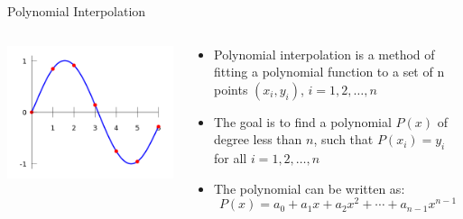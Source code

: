 \documentclass[fullscreen=true, bookmarks=true, hyperref={pdfencoding=unicode}]{beamer}
\begin{document}
\begin{frame}{Polynomial Interpolation}
  \begin{columns}
      \begin{column}{.3\paperwidth}
        \includegraphics[keepaspectratio, width=.3\paperwidth]{440px-Interpolation_example_polynomial.png}
      \end{column}
      \begin{column}{.7\paperwidth}
        \begin{itemize}
        \item Polynomial interpolation is a method of fitting 
        a polynomial function to a set of n points $(x_i, y_i)$, $i = 1, 2, \dots, n$
        \item The goal is to find a polynomial $P(x)$ of degree less than $n$, 
        such that $P(x_i) = y_i$ for all $i = 1, 2, \dots, n$
        \item The polynomial can be written as:
          \[
          P(x) = a_0 + a_1x + a_2x^2 + \cdots + a_{n-1}x^{n-1}
          \]
      \end{itemize}          
    \end{column}
  \end{columns}
\end{frame}
\end{document}
